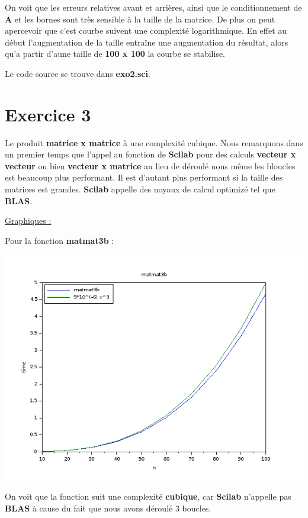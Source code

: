 \documentclass[12pt, letterpaper]{article}
\begin{document}
On voit que les erreurs relatives avant et arrières, ainsi que le
conditionnement de \textbf{A} et les bornes sont très sensible à la
taille de la matrice. De plus on peut apercevoir que c'est courbe
suivent une complexité logarithmique. En effet au début
l'augmentation de la taille entraîne une augmentation du résultat,
alors qu'a partir d'aune taille de \textbf{100 x 100} la courbe se
stabilise. \newline

Le code source se trouve dans \textbf{exo2.sci}.

\section*{Exercice 3}

Le produit \textbf{matrice x matrice} à une complexité cubique.
Nous remarquons dans un premier temps que l'appel au fonction de
\textbf{Scilab} pour des calculs \textbf{vecteur x vecteur} ou bien
\textbf{vecteur x matrice} au lieu de déroulé nous même les bloucles
est beaucoup plus performant. Il est d'autant plus performant si la
taille des matrices est grandes. \textbf{Scilab} appelle des noyaux de
calcul optimizé tel que \textbf{BLAS}. \newline

\underline{Graphiques :} \newline

Pour la fonction \textbf{matmat3b} :

\includegraphics[scale=0.5]{img/matmat3b.png}

On voit que la fonction suit une complexité \textbf{cubique}, car
\textbf{Scilab} n'appelle pas \textbf{BLAS} à cause du fait que nous
avons déroulé 3 boucles. \newline
\end{document}
